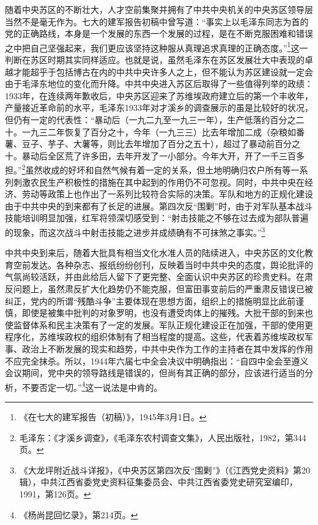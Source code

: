 随着中央苏区的不断壮大，人才空前集聚并拥有了中共中央机关的中央苏区领导层当然不是毫无作为。七大的建军报告初稿中曾写道：“事实上以毛泽东同志为首的党的正确路线，本身是一个发展的东西一个发展的过程，是在不断克服困难和错误之中把自己坚强起来，我们更应该坚持这种服从真理追求真理的正确态度。”\footnote{《在七大的建军报告（初稿）》，1945年3月1日。}这一判断在苏区时期其实同样适应。也就是说，虽然毛泽东在苏区发展壮大中表现的卓越才能超乎于包括博古在内的中共中央许多人之上，但不能认为苏区建设就一定会由于毛泽东地位的变化而升降。中共中央进入苏区后取得了一些值得列举的政绩：1933年，在连续两年歉收后，中央苏区迎来了苏维埃政府建立后的第一个丰收年，产量接近革命前的水平，毛泽东1933年对才溪乡的调查展示的虽是比较好的状况，但仍有一定的代表性：“暴动后（一九二九至一九三一年），生产低落约百分之二十。一九三二年恢复了百分之十，今年（一九三三）比去年增加二成（杂粮如番薯、豆子、芋子、大薯等，则比去年增加了百分之五十），超过了暴动前百分之十。暴动后全区荒了许多田，去年开发了一小部分。今年大开，开了一千三百多担。”\footnote{毛泽东：《才溪乡调查》，《毛泽东农村调查文集》，人民出版社，1982，第344页。}虽然收成的好坏和自然气候有着一定的关系，但土地明确归农户所有等一系列刺激农民生产积极性的措施在其中起到的作用仍不可忽视。同时，中共中央在经济、劳动等政策上也作出了一系列比较符合实际的决策。军队和地方的正规化建设由于中共中央的到来都有了长足的进展。第四次反“围剿”时，由于对军队基本战斗技能培训明显加强，红军将领深切感受到：“射击技能之不够在过去成为部队普遍的现象，而这次战斗中射击技能之进步并成绩确有不可抹煞之事实。”\footnote{《大龙坪附近战斗详报》，《中央苏区第四次反“围剿”》（《江西党史资料》第20辑），中共江西省委党史资料征集委员会、中共江西省委党史研究室编印，1991，第126页。}


中共中央到来后，随着大批具有相当文化水准人员的陆续进入，中央苏区的文化教育空前发达。各种杂志、报纸纷纷创刊，反映着当时中共中央的态度，舆论批评的气氛尚较活跃，并由此给后人留下了更完整、全面认识中央苏区的珍贵史料。在肃反问题上，虽然肃反扩大化趋势仍不能克服，但富田事变前后的严重肃反错误已被纠正，党内的所谓“残酷斗争”主要体现在思想方面，组织上的措施明显比此前谨慎，即使是被集中批判的对象罗明，也没有遭受肉体上的摧残。大批干部的到来也使监督体系和民主决策有了一定的发展。军队正规化建设正在加强，干部的使用更程序化，苏维埃政权的组织体制有了相当程度的提高。这些，代表着苏维埃政权军事、政治上不断发展的现实和趋势，中共中央作为工作的主持者在其中发挥的作用不应完全抹杀。所以，1944年六届七中全会决议中明确指出：“自四中全会至遵义会议期间，党中央的领导路线是错误的，但尚有其正确的部分，应该进行适当的分析，不要否定一切。”\footnote{《杨尚昆回忆录》，第214页。}这一说法是中肯的。


